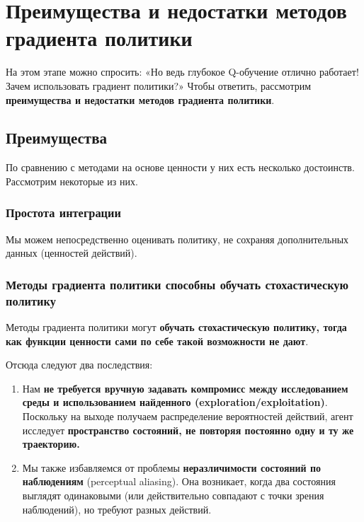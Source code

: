 \documentclass[11pt,a4paper]{article}
\begin{document}
\section{Преимущества и недостатки методов градиента политики}\label{the-advantages-and-disadvantages-of-policy-gradient-methods}

На этом этапе можно спросить: «Но ведь глубокое Q-обучение отлично работает! Зачем использовать градиент политики?» Чтобы ответить, рассмотрим \textbf{преимущества и недостатки методов градиента политики}.

\subsection{Преимущества}\label{advantages}

По сравнению с методами на основе ценности у них есть несколько достоинств. Рассмотрим некоторые из них.

\subsubsection{Простота интеграции}\label{the-simplicity-of-integration}

Мы можем непосредственно оценивать политику, не сохраняя дополнительных данных (ценностей действий).

\subsubsection{Методы градиента политики способны обучать стохастическую политику}\label{policy-gradient-methods-can-learn-a-stochastic-policy}

Методы градиента политики могут \textbf{обучать стохастическую политику, тогда как функции ценности сами по себе такой возможности не дают}.

Отсюда следуют два последствия:

\begin{enumerate}
\def\labelenumi{\arabic{enumi}.}
\item
  Нам \textbf{не требуется вручную задавать компромисс между исследованием среды и использованием найденного (exploration/exploitation)}. Поскольку на выходе получаем распределение вероятностей действий, агент исследует \textbf{пространство состояний, не повторяя постоянно одну и ту же траекторию.}
\item
  Мы также избавляемся от проблемы \textbf{неразличимости состояний по наблюдениям} (perceptual aliasing). Она возникает, когда два состояния выглядят одинаковыми (или действительно совпадают с точки зрения наблюдений), но требуют разных действий.
\end{enumerate}
\end{document}
